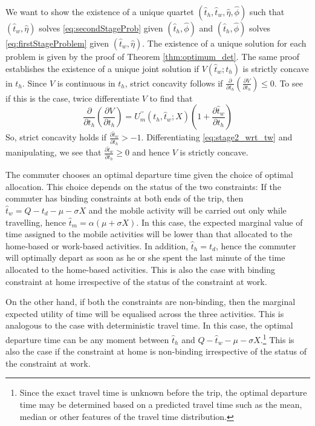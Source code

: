 \documentclass[12pt,a4paper,british]{article}
\makeatletter
\newenvironment{proof}[1][\proofname]{\par
    \normalfont\topsep6\p@\@plus6\p@\relax
    \trivlist
    \itemindent\parindent
    \item[\hskip\labelsep
          \scshape
      #1]\ignorespaces
  }{%
    \endtrivlist\@endpefalse
  }
\providecommand{\proofname}{Proof}
\makeatother
\begin{document}
\begin{proof}
We want to show the existence of a unique quartet $\left( \hat{t}_{h},\hat{t}_{w}, \hat{\eta},\hat{\phi}\right)$ such that $\left( \hat{t}_{w}, \hat{\eta}\right)$ solves \eqref{eq:secondStageProb} given $\left( \hat{t}_{h},\hat{\phi}\right)$ and $\left( \hat{t}_{h},\hat{\phi}\right)$ solves \eqref{eq:firstStageProblem} given $\left( \hat{t}_{w},\hat{\eta}\right)$. The existence of a unique solution for each problem is given by the proof of Theorem \ref{thm:optimum_det}. The same proof establishes the existence of a unique joint solution if $V\left(\hat{t}_{w};t_{h}\right)$ is strictly concave in $t_{h}$. Since $V$ is continuous in $t_{h}$, strict concavity follows if $\frac{\partial}{\partial t_{h}}\left(\frac{\partial V}{\partial t_{h}}\right) \leq 0$. To see if this is the case, twice differentiate $V$ to find that%
\begin{equation*}
\frac{\partial}{\partial t_{h}}\left(\frac{\partial V}{\partial t_{h}}\right) = U_{m}^{\prime\prime} \left(t_{h}, \hat{t}_{w}; X \right) \left( 1 + \frac{\partial\hat{t}_{w}}{\partial t_{h}}\right)
\end{equation*}
So, strict concavity holds if $\frac{\partial\hat{t}_{w}}{\partial t_{h}} > -1$. Differentiating \eqref{eq:stage2_wrt_tw} and manipulating, we see that  $\frac{\partial\hat{t}_{w}} {\partial t_{h}} \geq 0$ and hence $V$ is strictly concave.
\end{proof}


The commuter chooses an optimal departure time given the choice of optimal allocation. This choice depends on the status of the two constraints: If the commuter has binding constraints at both ends of the trip, then $\hat{t}_{w}=Q-t_{d}-\mu-\sigma X$ and the mobile activity will be carried out only while travelling, hence $\hat{t}_{m}=\alpha\left(\mu+\sigma X\right)$. In this case, the expected marginal value of time assigned to the mobile activities will be lower than that allocated to the home-based or work-based activities. In addition, $\hat{t}_{h}=t_{d}$, hence the commuter will optimally depart as soon as he or she spent the last minute of the time allocated to the home-based activities. This is also the case with binding constraint at home irrespective of the status of the constraint at work.

On the other hand, if both the constraints are non-binding, then the marginal expected utility of time will be equalised across the three activities. This is analogous to the case with deterministic travel time. In this case, the optimal departure time can be any moment between $\hat{t}_{h}$ and $Q-\hat{t}_{w}-\mu-\sigma X$.\footnote{Since the exact travel time is unknown before the trip, the optimal departure time may be determined based on a predicted travel time such as the mean, median or other features of the travel time distribution.} This is also the case if the constraint at home is non-binding irrespective of the status of the constraint at work.
\end{document}

